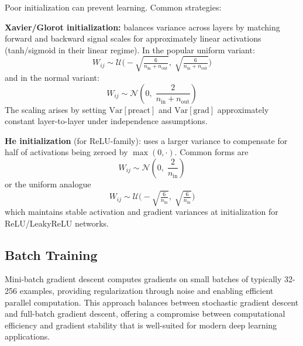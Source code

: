 Poor initialization can prevent learning. Common strategies:

\textbf{Xavier/Glorot initialization:} balances variance across layers by matching forward and backward signal scales for approximately linear activations (tanh/sigmoid in their linear regime). In the popular uniform variant:
\begin{equation}
W_{ij} \sim \mathcal{U}\Big(-\sqrt{\tfrac{6}{n_{\text{in}} + n_{\text{out}}}},\; \sqrt{\tfrac{6}{n_{\text{in}} + n_{\text{out}}}}\Big)
\end{equation}
and in the normal variant:
\begin{equation}
W_{ij} \sim \mathcal{N}\!\left(0, \; \frac{2}{n_{\text{in}} + n_{\text{out}}}\right)
\end{equation}
The scaling arises by setting $\mathrm{Var}[\text{preact}]$ and $\mathrm{Var}[\text{grad}]$ approximately constant layer-to-layer under independence assumptions.

\textbf{He initialization} (for ReLU-family): uses a larger variance to compensate for half of activations being zeroed by $\max(0,\cdot)$. Common forms are
\begin{equation}
W_{ij} \sim \mathcal{N}\!\left(0, \; \frac{2}{n_{\text{in}}}\right)
\end{equation}
or the uniform analogue
\begin{equation}
W_{ij} \sim \mathcal{U}\Big(-\sqrt{\tfrac{6}{n_{\text{in}}}},\; \sqrt{\tfrac{6}{n_{\text{in}}}}\Big)
\end{equation}
which maintains stable activation and gradient variances at initialization for ReLU/LeakyReLU networks.

\subsection{Batch Training}

Mini-batch gradient descent computes gradients on small batches of typically 32-256 examples, providing regularization through noise and enabling efficient parallel computation. This approach balances between stochastic gradient descent and full-batch gradient descent, offering a compromise between computational efficiency and gradient stability that is well-suited for modern deep learning applications.


